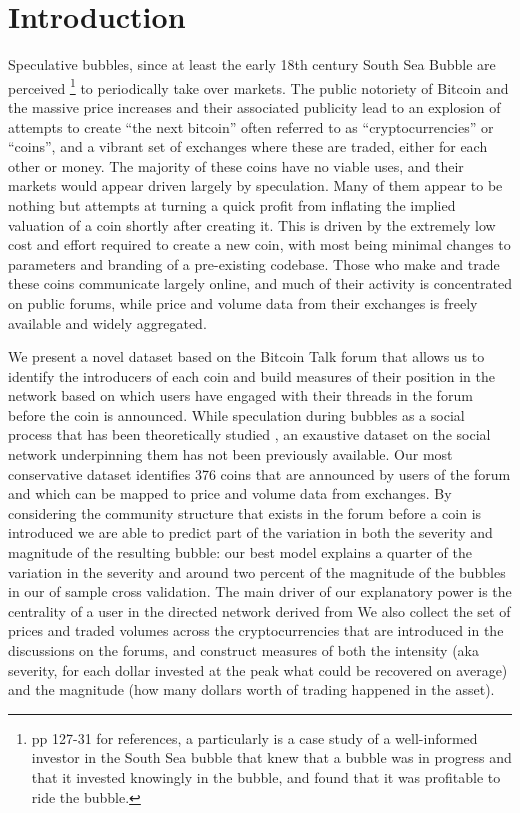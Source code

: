 \section{Introduction}

Speculative bubbles, since at least the early 18th century South Sea Bubble are perceived \footnote{\cite{garber2001famous} pp 127-31 for references, a particularly is \cite{temin2004riding} a case study of a well-informed investor in the South Sea bubble that knew that a bubble was in progress and that it invested knowingly in the bubble, and found that it was profitable to ride the bubble. } to periodically take over markets. %
The public notoriety of Bitcoin and the massive price increases and their associated publicity  lead to an explosion of attempts to create ``the next bitcoin'' often referred to as ``cryptocurrencies'' or ``coins'', and a vibrant set of exchanges where these are traded, either for each other or money.
The majority of these coins have no viable uses, and their markets would appear driven largely by speculation.
Many of them appear to be nothing but attempts at turning a quick profit from inflating the implied valuation of a coin shortly after creating it.
This is driven by the extremely low cost and effort required to create a new coin, with most being minimal changes to parameters and branding of a pre-existing codebase.
Those who make and trade these coins communicate largely online, and much of their activity is concentrated on public forums, while price and volume data from their exchanges is freely available and widely aggregated.


We present a novel dataset based on the Bitcoin Talk forum that allows us to identify the introducers of each coin and build measures of their position in the network based on which users have engaged with their threads in the forum before the coin is announced.
While speculation during bubbles as a social process that has been theoretically studied \cite{abolafia1988enacting, earl2007decision, bakker2010social, harras2011grow}, an exaustive dataset on the social network underpinning them has not been previously available.
Our most conservative dataset identifies 376 coins that are announced by users of the forum and which can be mapped to price and volume data from exchanges.
By considering the community structure that exists in the forum before a coin is introduced we are able to predict part of the variation in both the severity and magnitude of the resulting bubble: our best model explains a quarter of the variation in the severity and around two percent of the magnitude of the bubbles in our of sample cross validation. 
The main driver of our explanatory power is the centrality of a user in the directed network derived from 
We also collect the set of prices and traded volumes across the cryptocurrencies that are introduced in the discussions on the forums, and construct measures of both the intensity (aka severity, for each dollar invested at the peak what could be recovered on average) and the magnitude (how many dollars worth of trading happened in the asset).

